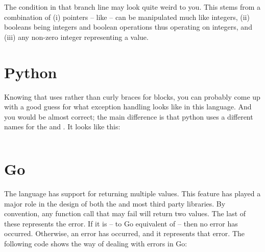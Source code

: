 \inputminted[firstline=1]{c}{../src/c/exceptions/errorhandling/errorhandling.c}

The condition in that branch line may look quite weird to you. This stems from a combination of (i) pointers -- like  -- can be manipulated much like integers, (ii) booleans being integers and boolean operations thus operating on integers, and (iii) any non-zero integer representing a  value.

\section{Python}

Knowing that  uses  rather than curly braces for blocks, you can probably come up with a good guess for what exception handling looks like in this language. And you would be almost correct; the main difference is that python uses a different names for the   and . It looks like this:

\inputminted[firstline=3]{python}{../src/python/exceptions/catching/catching.py}

\section{Go}

The  language has support for returning multiple values. This feature has played a major role in the design of both the  and most third party libraries. By convention, any function call that may fail will return two values. The last of these represents the error. If it is  -- to Go equivalent of  -- then no error has occurred. Otherwise, an error has occurred, and it represents that error. The following code shows the  way of dealing with errors in Go:

